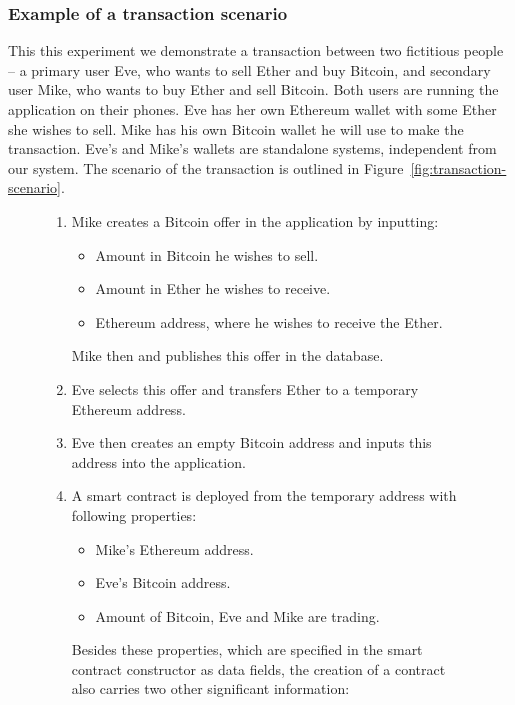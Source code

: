 \subsubsection{Example of a transaction scenario}
This this experiment we demonstrate a transaction between two fictitious people -- a primary user Eve, who wants to sell Ether and buy Bitcoin, and secondary user Mike, who wants to buy Ether and sell Bitcoin. Both users are running the application on their phones. Eve has her own Ethereum wallet with some Ether she wishes to sell. Mike has his own Bitcoin wallet he will use to make the transaction. Eve's and Mike's wallets are standalone systems, independent from our system. The scenario of the transaction is outlined in Figure~\ref{fig:transaction-scenario}. 

\begin{figure}[ht]
    \centering
    \begin{framed}
    \begin{enumerate}[noitemsep]
        \item Mike creates a Bitcoin offer in the application by inputting:
            \begin{itemize}[nolistsep,noitemsep]
                \item Amount in Bitcoin he wishes to sell.
                \item Amount in Ether he wishes to receive.
                \item Ethereum address, where he wishes to receive the Ether.
            \end{itemize}
            Mike then and publishes this offer in the database.
        \item Eve selects this offer and transfers Ether to a temporary Ethereum address.
        \item Eve then creates an empty Bitcoin address and inputs this address into the application.
        \item A smart contract is deployed from the temporary address with following properties:
            \begin{itemize}[nolistsep,noitemsep]
                \item Mike's Ethereum address.
                \item Eve's Bitcoin address.
                \item Amount of Bitcoin, Eve and Mike are trading.
            \end{itemize}
            Besides these properties, which are specified in the smart contract constructor as data fields, the creation of a contract also carries two other significant information:

\end{enumerate}
\end{framed}
\end{figure}
